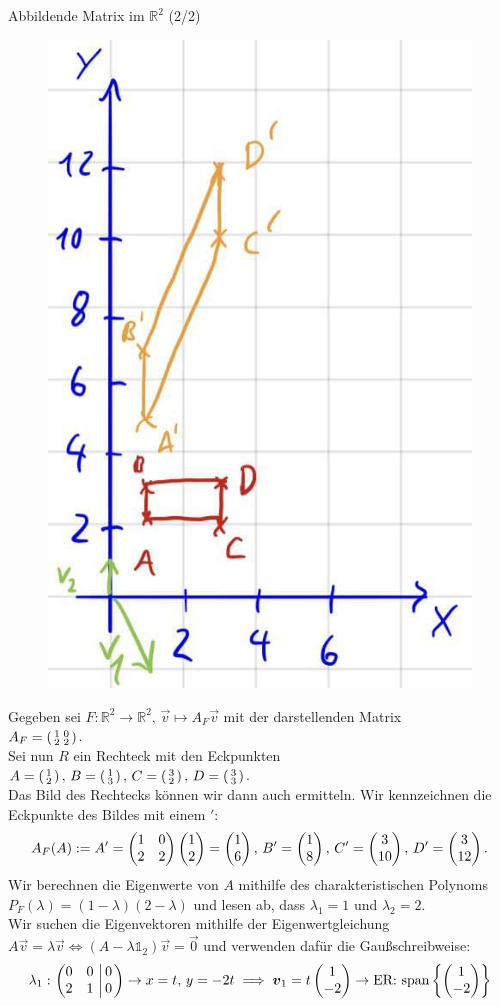 \begin{Beispiel}
{Abbildende Matrix im $\mathbb{R}^2$ (2/2)}
\begin{figure}
 \vspace{-15pt}
\includegraphics[width=.15\textwidth]{Dateien/02/02Anschauung1.jpg}
 \vspace{-15pt}
\end{figure}
Gegeben sei $F:\mathbb{R}^2\to\mathbb{R}^2,\,\Vec{v}\mapsto A_F\Vec{v}$ mit der darstellenden Matrix\\
$A_F=\left(\begin{smallmatrix}1&0\\2&2\end{smallmatrix}\right)$.\\
Sei nun $R$ ein Rechteck mit den Eckpunkten\\
$A=\left(\begin{smallmatrix}1\\2\end{smallmatrix}\right),\,B=\left(\begin{smallmatrix}1\\3\end{smallmatrix}\right),\,C=\left(\begin{smallmatrix}3\\2\end{smallmatrix}\right),\,D=\left(\begin{smallmatrix}3\\3\end{smallmatrix}\right)$.\\
Das Bild des Rechtecks können wir dann auch ermitteln.
Wir kennzeichnen die Eckpunkte des Bildes mit einem $'$:
\begin{equation*}
    A_F(A):=A'=\begin{pmatrix}1&0\\2&2\end{pmatrix}\begin{pmatrix}1\\2\end{pmatrix}=\begin{pmatrix}1\\6\end{pmatrix},\,B'=\begin{pmatrix}1\\8\end{pmatrix},\,C'=\begin{pmatrix}3\\10\end{pmatrix},\,D'=\begin{pmatrix}3\\12\end{pmatrix}.
\end{equation*}
Wir berechnen die Eigenwerte von $A$ mithilfe des charakteristischen Polynoms\\ $P_F(\lambda)=(1-\lambda)(2-\lambda)$ und lesen ab, dass $\lambda_1=1$ und $\lambda_2=2$.\\
Wir suchen die Eigenvektoren mithilfe der Eigenwertgleichung $A\Vec{v}=\lambda \Vec{v}\iff (A-\lambda\mathds{1}_2)\Vec{v}=\Vec{0}$ und verwenden dafür die Gaußschreibweise:
\begin{align*}
    \lambda_1:&\,\MatrixInvertieren{0&0\\2&1}{0\\0}\to x=t, \,y=-2t\implies \Vec{v}_1=t\Matrix{1\\-2}\to \tx{ER: } \Spann{\Matrix{1\\-2}}\\

\end{align*}
\end{Beispiel}

